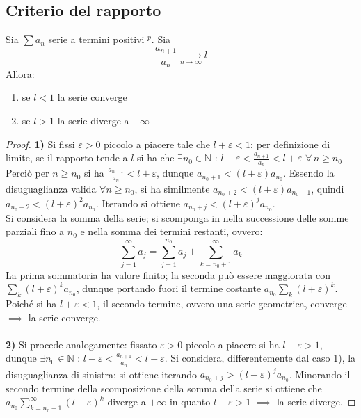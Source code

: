 \documentclass[10pt, oneside]{book}
\theoremstyle{plain}
\begin{document}
\subsection{Criterio del rapporto}
\begin{ther}
Sia $\sum a_n$ serie a termini positivi \hyperlink{posit}{$^p$}. Sia
\[\frac{a_{n+1}}{a_n} \xrightarrow[n \rightarrow \infty]{} l\]
Allora:
\begin{enumerate}
    \item se $l < 1$ la serie converge
    \item se $l > 1$ la serie diverge a $+ \infty$
\end{enumerate}
\end{ther}
\begin{proof}
\textbf{1)} Si fissi $\varepsilon > 0$ piccolo a piacere tale che $l + \varepsilon < 1$; per definizione di limite, se il rapporto tende a $l$ si ha che $\exists n_0 \in \mathbb{N}$ : $\displaystyle l - \varepsilon < \frac{a_{n + 1}}{a_n} < l + \varepsilon$ $\forall \, n \geq n_0$
\\Perciò per $n \geq n_0$ si ha $\displaystyle \frac{a_{n + 1}}{a_n} < l + \varepsilon$, dunque $a_{n_0 +1} < (l + \varepsilon) a_{n_0}$. Essendo la disuguaglianza valida $\forall n \geq n_0$, si ha similmente $a_{n_0 + 2} < (l + \varepsilon) a_{n_0 +1}$, quindi $a_{n_0 + 2} < (l + \varepsilon)^2 a_{n_0}$. Iterando si ottiene $a_{n_0 + j} < (l + \varepsilon)^j a_{n_0}$.
\\Si considera la somma della serie; si scomponga in nella successione delle somme parziali fino a $n_0$ e nella somma dei termini restanti, ovvero:
\[\sum \limits_{j=1}^{\infty} a_j = \sum \limits_{j=1}^{n_0} a_j + \sum \limits_{k=n_0 + 1}^{\infty} a_k\]
La prima sommatoria ha valore finito; la seconda può essere maggiorata con $\sum_k (l + \varepsilon)^k a_{n_0}$, dunque portando fuori il termine costante $a_{n_0} \sum_k (l + \varepsilon)^k$. Poiché si ha $l + \varepsilon < 1$, il secondo termine, ovvero una serie geometrica, converge $\implies$ la serie converge.
\\~\\\textbf{2)} Si procede analogamente: fissato $\varepsilon > 0$ piccolo a piacere si ha $l - \varepsilon > 1$, dunque $\exists n_0 \in \mathbb{N}$ : $\displaystyle l - \varepsilon < \frac{a_{n + 1}}{a_n} < l + \varepsilon$. Si considera, differentemente dal caso 1), la disuguaglianza di sinistra; si ottiene iterando $a_{n_0 + j} > (l - \varepsilon)^j a_{n_0}$. Minorando il secondo termine della scomposizione della somma della serie si ottiene che $a_{n_0} \sum \limits_{k=n_0 + 1}^{\infty} (l - \varepsilon)^k$ diverge a $+ \infty$ in quanto $l - \varepsilon > 1$ $\implies$ la serie diverge.
\end{proof}
\end{document}
